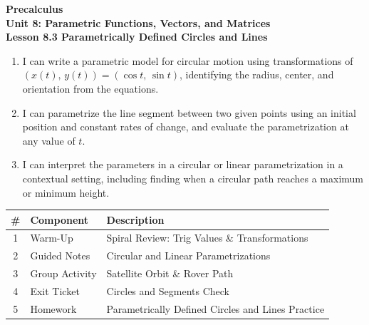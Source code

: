 \documentclass[10pt]{article}
\begin{document}
\vspace{-0.8in}

\begin{center}
  {\color{white}\textbf{\LARGE Precalculus}}\\[4pt]
  {\color{skymid}\large\textbf{Unit 8: Parametric Functions, Vectors, and Matrices}}\\[6pt]
  {\color{white}\textbf{\large Lesson 8.3 \quad Parametrically Defined Circles and Lines}}
\end{center}

\vspace{0.22in}
\namedateperiod
\vspace{0.18in}

\begin{learningtargetbox}
\small
\begin{enumerate}[leftmargin=1.5em, itemsep=5pt]
  \item I can write a parametric model for circular motion using transformations
    of $(x(t),\,y(t)) = (\cos t,\,\sin t)$, identifying the radius, center,
    and orientation from the equations.
  \item I can parametrize the line segment between two given points using an
    initial position and constant rates of change, and evaluate the
    parametrization at any value of $t$.
  \item I can interpret the parameters in a circular or linear parametrization
    in a contextual setting, including finding when a circular path reaches a
    maximum or minimum height.
\end{enumerate}
\end{learningtargetbox}

\vspace{0.14in}

\begin{tocbox}
\small
\renewcommand{\arraystretch}{1.5}
\begin{tabularx}{\linewidth}{@{} c l X @{}}
\rowcolor{sky}
\textbf{\#} & \textbf{Component} & \textbf{Description} \\
\midrule
1 & Warm-Up        & Spiral Review: Trig Values \& Transformations \\
2 & Guided Notes   & Circular and Linear Parametrizations \\
3 & Group Activity & Satellite Orbit \& Rover Path \\
4 & Exit Ticket    & Circles and Segments Check \\
5 & Homework       & Parametrically Defined Circles and Lines Practice \\
\end{tabularx}
\end{tocbox}
\end{document}

